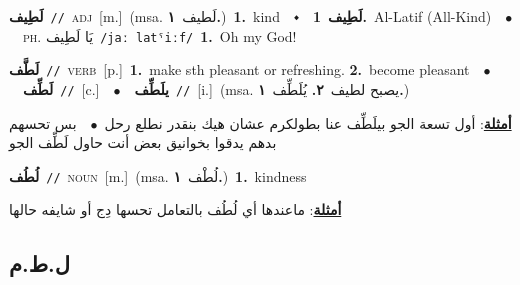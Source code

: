\documentclass[10pt,a4paper,twoside]{article} %
\begin{document}
\begin{multicols}{2}
{\setlength\topsep{0pt}\textbf{\foreignlanguage{arabic}{لَطِيف}}\ {\color{gray}\texttt{//}\color{black}}\ \textsc{adj}\ [m.]\ \color{gray}(msa. \foreignlanguage{arabic}{لَطيف}~\foreignlanguage{arabic}{\textbf{١.}})\color{black}\ \textbf{1.}~kind\ \ $\smblkdiamond$\ \ \setlength\topsep{0pt}\textbf{\foreignlanguage{arabic}{لَطِيف}}\ \textbf{1.}~Al-Latif (All-Kind)\ \ $\bullet$\ \ \textsc{ph.} \color{gray} \foreignlanguage{arabic}{يَا لَطِيف}\color{black}\ {\color{gray}\texttt{/{\sffamily jaː latˤiːf}/}\color{black}}\ \textbf{1.}~Oh my God!\ } \vspace{2mm}

{\setlength\topsep{0pt}\textbf{\foreignlanguage{arabic}{لَطَّف}}\ {\color{gray}\texttt{//}\color{black}}\ \textsc{verb}\ [p.]\ \textbf{1.}~make sth pleasant or refreshing.  \textbf{2.}~become pleasant\ \ $\bullet$\ \ \setlength\topsep{0pt}\textbf{\foreignlanguage{arabic}{لَطِّف}}\ {\color{gray}\texttt{//}\color{black}}\ [c.]\ \ $\bullet$\ \ \setlength\topsep{0pt}\textbf{\foreignlanguage{arabic}{يلَطِّف}}\ {\color{gray}\texttt{//}\color{black}}\ [i.]\ \color{gray}(msa. \foreignlanguage{arabic}{يصبح لطيف}~\foreignlanguage{arabic}{\textbf{٢.}}  \foreignlanguage{arabic}{يُلَطِّف}~\foreignlanguage{arabic}{\textbf{١.}})\color{black}\  \begin{flushright}\color{gray}\foreignlanguage{arabic}{\textbf{\underline{\foreignlanguage{arabic}{أمثلة}}}: أول تسعة الجو بيلَطِّف عنا بطولكرم عشان هيك بنقدر نطلع رحل\ $\bullet$\ \  بس تحسهم بدهم يدقوا بخوانيق بعض أنت حاول لَطِّف الجو}\end{flushright}\color{black}} \vspace{2mm}

{\setlength\topsep{0pt}\textbf{\foreignlanguage{arabic}{لُطُف}}\ {\color{gray}\texttt{//}\color{black}}\ \textsc{noun}\ [m.]\ \color{gray}(msa. \foreignlanguage{arabic}{لُطْف}~\foreignlanguage{arabic}{\textbf{١.}})\color{black}\ \textbf{1.}~kindness\  \begin{flushright}\color{gray}\foreignlanguage{arabic}{\textbf{\underline{\foreignlanguage{arabic}{أمثلة}}}: ماعندها أي لُطُف بالتعامل تحسها دِج أو شايفه حالها}\end{flushright}\color{black}} \vspace{2mm}

\vspace{-3mm}
\subsection*{\color{blue}\foreignlanguage{arabic}{ل.ط.م}\color{blue}{}} 


\end{multicols}
\end{document}
